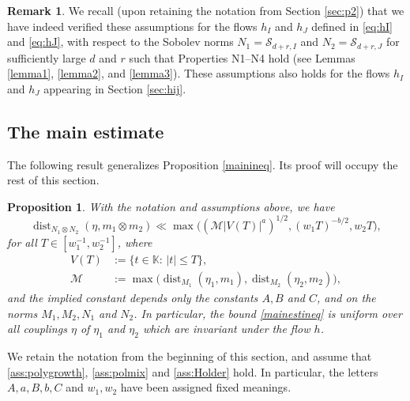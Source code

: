 \documentclass[11pt,reqno,a4paper]{amsart}
\numberwithin{equation}{section}
\newcommand{\cS}{\mathcal{S}}
\newcommand{\bK}{\mathbb{K}}
\DeclareMathOperator{\dist}{dist}
\theoremstyle{theorem}
\newtheorem{proposition}[theorem]{Proposition}
\theoremstyle{definition}
\newtheorem{remark}[theorem]{Remark}
\begin{document}
\begin{remark}
We recall (upon retaining the notation from Section \ref{sec:p2}) that we have indeed 
verified these assumptions for the flows $h_I$ and $h_J$
defined in \eqref{eq:hI} and \eqref{eq:hJ}, with respect to the Sobolev norms 
$N_1 = \cS_{d+r,I}$ and $N_2 = \cS_{d+r,J}$ for sufficiently large $d$ and $r$ such that Properties N1--N4 hold
(see Lemmas \ref{lemma1}, \ref{lemma2}, and \ref{lemma3}). 
These assumptions also holds for the flows $h_I$ and $h_J$
appearing in Section \ref{sec:hij}.
\end{remark}

\subsection{The main estimate}

The following result generalizes Proposition \ref{mainineq}. Its proof will occupy the rest of this section.

\begin{proposition}
\label{mainest}
With the notation and assumptions above, we have 
\begin{equation}
\label{mainestineq}
\dist_{N_1 \otimes N_2}(\eta,m_1 \otimes m_2)
\ll
\max\big((\mathcal{M}|V(T)|^a)^{1/2},(w_1 T)^{-b/2}, w_2 T \big),
\end{equation}
for all $T\in [w_1^{-1},w_2^{-1}]$, where
\begin{align*}
V(T)&:=\{t\in \bK:\, |t|\le T\},\\
\mathcal{M} &:= \max\big( \dist_{M_1}(\eta_1,m_1), \dist_{M_2}(\eta_2,m_2) \big),
\end{align*}
and the implied constant depends only the constants $A, B$ and $C$, and on the norms $M_1, M_2,N_1$ and $N_2$. 
In particular, the bound \eqref{mainestineq} is uniform over all couplings $\eta$ of $\eta_1$ and $\eta_2$ which are invariant under the flow $h$.
\end{proposition}

We retain the notation from the beginning of this section, and assume that \eqref{ass:polygrowth}, \eqref{ass:polmix} and \eqref{ass:Holder} hold. In particular, the letters $A,a,B,b,C$ and $w_1, w_2$ have been 
assigned fixed meanings. \\
\end{document}
